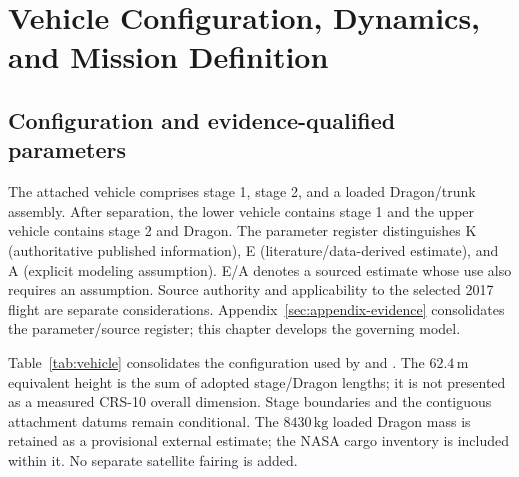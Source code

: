 \section{Vehicle Configuration, Dynamics, and Mission Definition}
\label{sec:vehicle}
\label{sec:vehicle-dynamics}

\subsection{Configuration and evidence-qualified parameters}
The attached vehicle comprises stage 1, stage 2, and a loaded Dragon/trunk assembly. After separation, the lower vehicle contains stage 1 and the upper vehicle contains stage 2 and Dragon. The parameter register distinguishes K (authoritative published information), E (literature/data-derived estimate), and A (explicit modeling assumption). E/A denotes a sourced estimate whose use also requires an assumption. Source authority and applicability to the selected 2017 flight are separate considerations. Appendix~\ref{sec:appendix-evidence} consolidates the parameter/source register; this chapter develops the governing model.

Table~\ref{tab:vehicle} consolidates the configuration used by  and . The $62.4\,\mathrm{m}$ equivalent height is the sum of adopted stage/Dragon lengths; it is not presented as a measured CRS-10 overall dimension. Stage boundaries and the contiguous attachment datums remain conditional. The $8430\,\mathrm{kg}$ loaded Dragon mass is retained as a provisional external estimate; the NASA cargo inventory is included within it. No separate satellite fairing is added.

